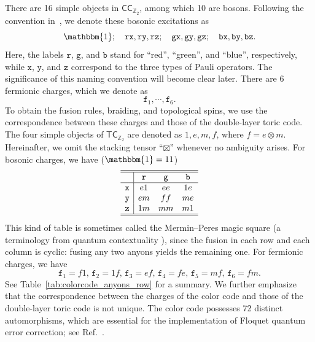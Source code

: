 \documentclass[a4paper,11pt]{article}
\newcommand{\Zbb}{\mathbb{Z}}
\theoremstyle{definition}
\theoremstyle{remark}
\theoremstyle{remark}
\newcommand{\one}{\mathbbm{1}}
\begin{document}
There are 16 simple objects in $\mathsf{CC}_{\mathbb{Z}_2}$, among which 10 are bosons. 
Following the convention in~\cite{kesselring2024anyon}, we denote these bosonic excitations as
\begin{equation*}
 \mathbbm{1};\quad    \mathtt{rx}, \mathtt{ry}, \mathtt{rz}; \quad
    \mathtt{gx}, \mathtt{gy}, \mathtt{gz}; \quad
    \mathtt{bx}, \mathtt{by}, \mathtt{bz}.
\end{equation*}
Here, the labels $\mathtt{r}$, $\mathtt{g}$, and $\mathtt{b}$ stand for ``red'', ``green'', and ``blue'', respectively, while 
$\mathtt{x}$, $\mathtt{y}$, and $\mathtt{z}$ correspond to the three types of Pauli operators.
The significance of this naming convention will become clear later.
There are 6 fermionic charges, which we denote as
\begin{equation*}
    \mathtt{f}_1,\cdots, \mathtt{f}_6.
\end{equation*}
To obtain the fusion rules, braiding, and topological spins, we use the correspondence between these charges and those of the double-layer toric code. 
The four simple objects of $\mathsf{TC}_{\Zbb_2}$ are denoted as $1,e,m,f$, where $f=e\otimes m$. 
Hereinafter, we omit the stacking tensor ``$\boxtimes$'' whenever no ambiguity arises.
For bosonic charges, we have ($\one=11$)
\begin{equation*}
\begin{array}{c|ccc}
    \hline\hline
     & \mathtt{r} & \mathtt{g} & \mathtt{b} \\
    \hline
    \mathtt{x} & e1 & ee & 1e \\
    \mathtt{y} & em & ff & me \\
    \mathtt{z} & 1m & mm & m1 \\
    \hline\hline
\end{array}
\end{equation*}
This kind of table is sometimes called the Mermin--Peres magic square (a terminology from quantum contextuality \cite{Peres1991MerminPeres,mermin1990simple}), since the fusion in each row and each column is cyclic: fusing any two anyons yields the remaining one.
For fermionic charges, we have
\begin{equation*}
    \mathtt{f}_1 = f 1,\,
    \mathtt{f}_2 = 1 f,\,
    \mathtt{f}_3 = e f,\,
    \mathtt{f}_4 = f e,\,
    \mathtt{f}_5 = m f,\,
    \mathtt{f}_6 = f m.
\end{equation*}
See Table~\ref{tab:colorcode_anyons_row} for a summary.
We further emphasize that the correspondence between the charges of the color code and those of the double-layer toric code is not unique. The color code possesses 72 distinct automorphisms, which are essential for the implementation of Floquet quantum error correction; see Ref.~\cite{Davydova2024quantumcomputation}.
\end{document}
